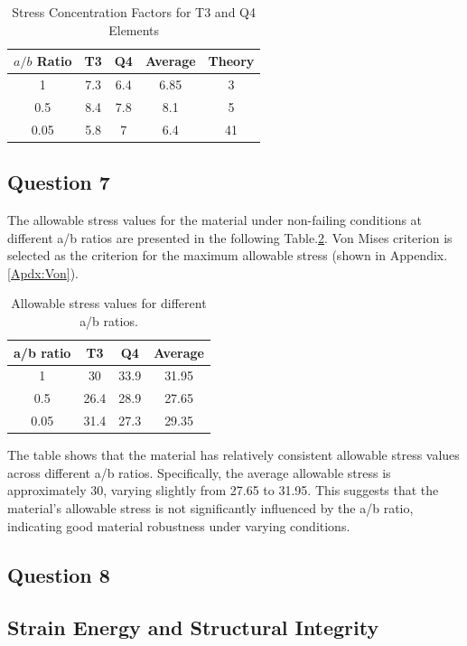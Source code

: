 \documentclass[twoside,twocolumn,10pt]{article}
\begin{document}
\begin{table}[!ht]
  \centering
  \caption{Stress Concentration Factors for T3 and Q4 Elements}
  \begin{tabular}{|c|c|c|c|c|}
  \hline
  \(a/b\) Ratio & T3 & Q4 & Average & Theory \\
  \hline
  1 & 7.3 & 6.4 & 6.85 & 3 \\
  0.5 & 8.4 & 7.8 & 8.1 & 5 \\
  0.05 & 5.8 & 7 & 6.4 & 41 \\
  \hline
  \end{tabular}
  \label{tab:SCF}
\end{table}

\subsection{Question 7}

The allowable stress values for the material under non-failing conditions at different a/b ratios are presented in the following Table.\ref{tab:criterion}. Von Mises criterion is selected as the criterion for the maximum allowable stress (shown in Appendix.\ref{Apdx:Von}).

\begin{table}[!ht]
\centering
\begin{tabular}{cccc}
\toprule
a/b  ratio & T3 & Q4 & Average \\
\midrule
1           & 30  & 33.9 & 31.95 \\
0.5         & 26.4& 28.9 & 27.65 \\
0.05        & 31.4& 27.3 & 29.35 \\
\bottomrule
\end{tabular}
\caption{Allowable stress values for different a/b ratios.}
\label{tab:criterion}
\end{table}


The table shows that the material has relatively consistent allowable stress values across different a/b ratios. Specifically, the average allowable stress is approximately 30, varying slightly from 27.65 to 31.95. This suggests that the material's allowable stress is not significantly influenced by the a/b ratio, indicating good material robustness under varying conditions.
\subsection{Question 8}

\subsection*{Strain Energy and Structural Integrity}
\end{document}
